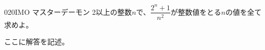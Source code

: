 \begin{prob}{020}{}{IMO マスターデーモン}
 2以上の整数$n$で、$\dfrac{2^n+1}{n^2}$が整数値をとる$n$の値を全て求めよ。 \\
\end{prob}
ここに解答を記述。